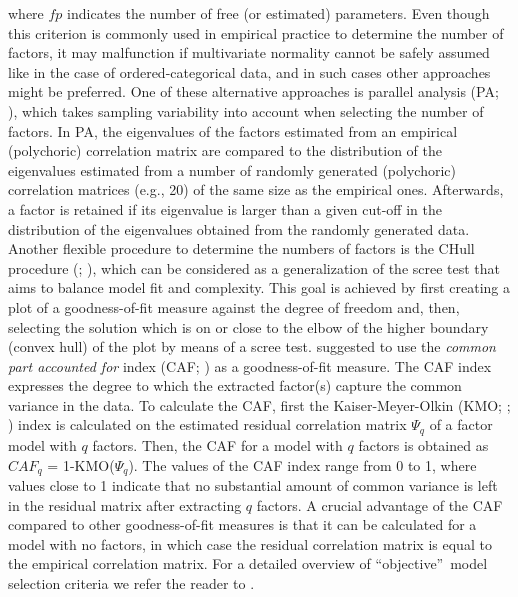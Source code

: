 \documentclass[a4paper,man,natbib]{apa6}
\begin{document}
\begin{linenumbers}
where $fp$ indicates the number of free (or estimated) parameters. Even though this criterion is commonly used in empirical practice to determine the number of factors, it may malfunction if multivariate normality cannot be safely assumed like in the case of ordered-categorical data, and in such cases other approaches might be preferred. One of these alternative approaches is parallel analysis (PA;  \citealp{horn1965rationale}), which takes sampling variability into account when selecting the number of factors. In PA, the eigenvalues of the factors estimated from an empirical (polychoric) correlation matrix are compared to the distribution of the eigenvalues estimated from a number of randomly generated (polychoric) correlation matrices (e.g., 20) of the same size as the empirical ones. Afterwards, a factor is retained if its eigenvalue is larger than a given cut-off in the distribution of the eigenvalues obtained from the randomly generated data. Another flexible procedure to determine the numbers of factors is the CHull procedure (\citealp*{ceulemans2006selecting}; \citealp{lorenzo2011hull}), which can be considered as a generalization of the scree test \citep{cattell1966scree} that aims to balance model fit and complexity. This goal is achieved by first creating a plot of a goodness-of-fit measure against the degree of freedom and, then, selecting the solution which is on or close to the elbow of the higher boundary (convex hull) of the plot by means of a scree test. \citet{lorenzo2011hull} suggested to use the \textit{common part accounted for} index (CAF; \citealp{lorenzo2011hull}) as a goodness-of-fit measure.  \label{refpage:R2Mj1a}The CAF index expresses the degree to which the extracted factor(s) capture the common variance in the data. To calculate the CAF, first the Kaiser-Meyer-Olkin (KMO; \citealp{kaiser1970second}; \citealp{kaiser1974little}) index is calculated on the estimated residual correlation matrix $\Psi_{q}$ of a factor model with $q$ factors. Then, the CAF for a model with $q$ factors is obtained as $CAF_{q}$ = 1-KMO($\Psi_{q}$). The values of the CAF index range from 0 to 1, where values close to 1 indicate that no substantial amount of common variance is left in the residual matrix after extracting $q$ factors. A crucial advantage of the CAF compared to other goodness-of-fit measures is that it can be calculated for a model with no factors, in which case the residual correlation matrix is equal to the empirical correlation matrix. For a detailed overview of \textquotedblleft objective\textquotedblright\, model selection criteria we refer the reader to \citet{lorenzo2011hull}.\\ %

\end{linenumbers}
\end{document}
